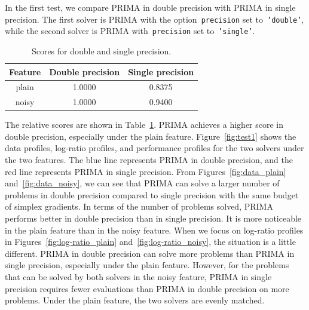 \documentclass[12pt,a4paper]{article}  %
\theoremstyle{definition}
\numberwithin{equation}{section}
\begin{document}
In the first test, we compare PRIMA in double precision with PRIMA in single precision. 
The first solver is PRIMA with the option~\texttt{precision} set to~\texttt{'double'}, while the second solver is PRIMA with~\texttt{precision} set to~\texttt{'single'}.
\begin{table}[htbp]
    
    \centering
    \caption{Scores for double and single precision.}
    \label{tab:diff_precision_results}
    
    \begin{tabular}{ccc}
        \toprule
        \textbf{Feature} & \textbf{Double precision} & \textbf{Single precision}   \\
        \midrule
        plain & 1.0000& 0.8375  \\
        noisy & 1.0000& 0.9400  \\
        \bottomrule
    \end{tabular}
    
\end{table}
The relative scores are shown in Table~\ref{tab:diff_precision_results}. PRIMA achieves a higher score in double precision, especially under the plain feature.
Figure~\ref{fig:test1} shows the data profiles, log-ratio profiles, and performance profiles for the two solvers under the two features.
The blue line represents PRIMA in double precision, and the red line represents PRIMA in single precision. 
From Figures~\ref{fig:data_plain} and~\ref{fig:data_noisy}, we can see that PRIMA can solve a larger number of problems in double precision compared to single precision with the same budget of simplex gradients. In terms of the number of problems solved, PRIMA performs better in double precision than in single precision. It is more noticeable in the plain feature than in the noisy feature. When we focus on log-ratio profiles in Figures~\ref{fig:log-ratio_plain} and~\ref{fig:log-ratio_noisy}, the situation is a little different. PRIMA in double precision can solve more problems than PRIMA in single precision, especially under the plain feature. However, for the problems that can be solved by both solvers in the noisy feature, PRIMA in single precision requires fewer evaluations than PRIMA in double precision on more problems. Under the plain feature, the two solvers are evenly matched.
\end{document}
